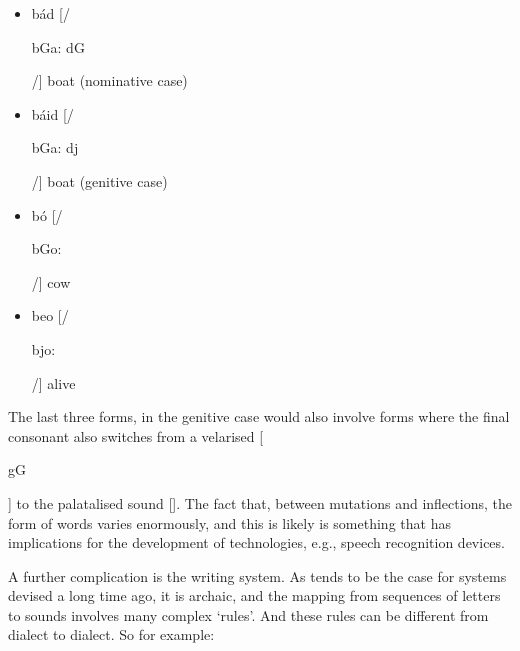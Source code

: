 \begin{multicols}{2}
\begin{itemize}
\item bád    [/\begin{IPA}b\super Ga: d\super G\end{IPA}/]  boat (nominative case)
\item báid   [/\begin{IPA}b\super Ga: d\super j\end{IPA}/]  boat (genitive case)
\end{itemize}


\begin{itemize} 
\item bó [/\begin{IPA}b\super Go: \end{IPA}/] cow 
\item beo [/\begin{IPA}b\super jo: \end{IPA}/] alive  
\end{itemize}  


The last three forms, in the genitive case would also involve forms where the final consonant also switches from a velarised [\begin{IPA}g\super G\end{IPA}] to the palatalised sound []. The fact that, between mutations and inflections, the form of words varies enormously, and this is likely is something that has implications for the development of technologies, e.g., speech recognition devices.

A further complication is the writing system. As tends to be the case for systems devised a long time ago, it is archaic, and the mapping from sequences of letters to sounds involves many complex ‘rules’. And these rules can be different from dialect to dialect. So for example:


\end{multicols}
